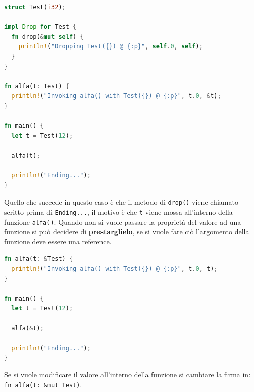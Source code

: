 \documentclass[12pt]{article}
\begin{document}
\begin{lstlisting}[language=rust]
struct Test(i32);

impl Drop for Test {
  fn drop(&mut self) {
    println!("Dropping Test({}) @ {:p}", self.0, self);
  }
}

fn alfa(t: Test) {
  println!("Invoking alfa() with Test({}) @ {:p}", t.0, &t);
}

fn main() {
  let t = Test(12);

  alfa(t);

  println!("Ending...");
}
\end{lstlisting}
Quello che succede in questo caso \`e che il metodo di \texttt{drop()} viene chiamato scritto prima di \texttt{Ending...}, il motivo \`e che \texttt{t} viene mossa all'interno della funzione \texttt{alfa()}. Quando non si vuole passare la propriet\`a del valore ad una funzione si pu\`o decidere di \textbf{prestarglielo}, se si vuole fare ci\`o l'argomento della funzione deve essere una reference.
\begin{lstlisting}[language=rust]
fn alfa(t: &Test) {
  println!("Invoking alfa() with Test({}) @ {:p}", t.0, t);
}

fn main() {
  let t = Test(12);

  alfa(&t);

  println!("Ending...");
}
\end{lstlisting}
Se si vuole modificare il valore all'interno della funzione si cambiare la firma in: \texttt{fn alfa(t: \&mut Test)}.

\hfill
\end{document}
